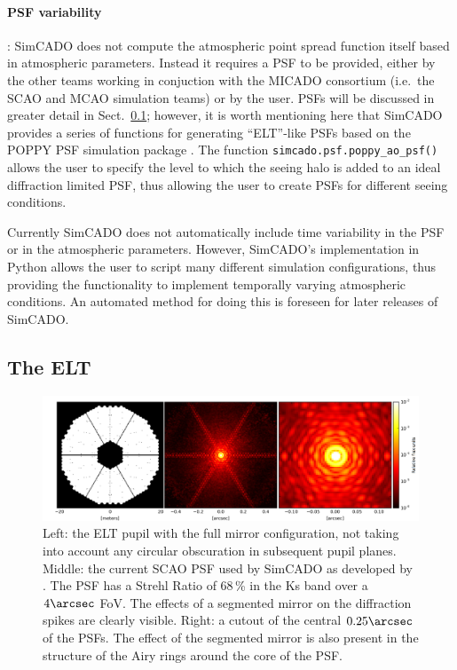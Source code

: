 \paragraph{PSF variability}: 
SimCADO does not compute the atmospheric point spread function itself based in atmospheric parameters. Instead it requires a PSF to be provided, either by the other teams working in conjuction with the MICADO consortium (i.e.\ the SCAO and MCAO simulation teams) or by the user. PSFs will be discussed in greater detail in Sect.~\ref{sec:eelt_psfs}; however, it is worth mentioning here that SimCADO provides a series of functions for generating ``ELT''-like PSFs based on the POPPY PSF simulation package \citep{poppy}. The function \verb+simcado.psf.poppy_ao_psf()+ allows the user to specify the level to which the seeing halo is added to an ideal diffraction limited PSF, thus allowing the user to create PSFs for different seeing conditions.

Currently SimCADO does not automatically include time variability in the PSF or in the atmospheric parameters. However, SimCADO's implementation in Python allows the user to script many different simulation configurations, thus providing the functionality to implement temporally varying atmospheric conditions. An automated method for doing this is foreseen for later releases of SimCADO.


\subsection{The ELT}
\label{sec:eelt_psfs}

\begin{figure}

    \centering
    \includegraphics[width=\textwidth]{images/fig2_eelt_psfs_SR50}

    \caption{Left: the ELT pupil with the full mirror configuration, not taking into account any circular obscuration in subsequent pupil planes. Middle: the current SCAO PSF used by SimCADO as developed by \citet{clenet2013}. The PSF has a Strehl Ratio of 68\,\% in the Ks band over a $4\arcsec$ FoV. The effects of a segmented mirror on the diffraction spikes are clearly visible. Right: a cutout of the central $0.25\arcsec$ of the PSFs. The effect of the segmented mirror is also present in the structure of the Airy rings around the core of the PSF.}

    \label{fig:2_elt_psfs}

\end{figure}


